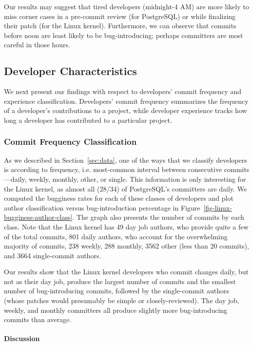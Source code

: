 Our results may suggest that tired developers (midnight-4 AM) are more likely to
miss corner cases in a pre-commit review (for PostgreSQL) or while finalizing
their patch (for the Linux kernel). Furthermore, we can observe that commits
before noon are least likely to be bug-introducing; perhaps committers are most
careful in those hours.

\subsection{Developer Characteristics}
\label{sec-dev-char}

We next present our findings with respect to developers' commit frequency and
experience classification. Developers' commit frequency summarizes the frequency
of a developer's contributions to a project, while developer experience tracks
how long a developer has contributed to a particular project.

\subsubsection{Commit Frequency Classification} 

As we described in Section~\ref{sec:data}, one of the ways that we classify
developers is according to frequency, i.e. most-common interval between
consecutive commits---daily, weekly, monthly, other, or single. This
information is only interesting for the Linux kernel, as almost all (28/34) of
PostgreSQL's committers are daily. We computed the bugginess rates for each of
these classes of developers and plot author classification versus
bug-introduction percentage in
Figure~\ref{fig-linux-bugginess-author-class}. The graph also presents the
number of commits by each class. Note that the Linux kernel has 49 day job
authors, who provide quite a few of the total commits, 801 daily authors, who
account for the overwhelming majority of commits, 238 weekly, 288 monthly, 3562
other (less than 20 commits), and 3664 single-commit authors.

Our results show that the Linux kernel developers who commit changes daily, but
not as their day job, produce the largest number of commits and the smallest
number of bug-introducing commits, followed by the single-commit authors (whose
patches would presumably be simple or closely-reviewed). The day job, weekly,
and monthly committers all produce slightly more bug-introducing commits than
average.

\paragraph{Discussion}

